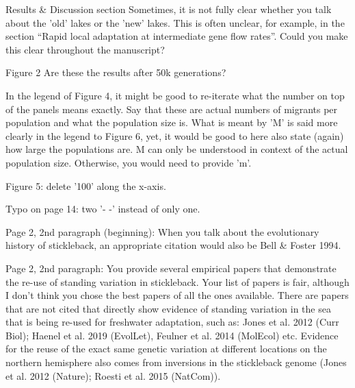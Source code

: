\reply{
}

\begin{point}{Results \& Discussion section}
    Sometimes, it is not fully clear whether you talk about the 'old' lakes or the 'new' lakes. This is often unclear, for example, in the section ``Rapid local adaptation at intermediate gene flow rates''. Could you make this clear throughout the manuscript?
\end{point}

\reply{
}

\begin{point}{Figure 2}
    Are these the results after 50k generations?
\end{point}

\reply{
}

\begin{point}{}
    In the legend of Figure 4, it might be good to re-iterate what the number on top of the panels means exactly. Say that these are actual numbers of migrants per population and what the population size is. What is meant by 'M' is said more clearly in the legend to Figure 6, yet, it would be good to here also state (again) how large the populations are. M can only be understood in context of the actual population size. Otherwise, you would need to provide 'm'.
\end{point}

\reply{
}

\begin{point}{}
Figure 5: delete '100' along the x-axis.
\end{point}

\reply{
}

\begin{point}{}
Typo on page 14: two '- -' instead of only one.
\end{point}


\begin{point}{}
Page 2, 2nd paragraph (beginning): When you talk about the evolutionary history of stickleback, an appropriate citation would also be Bell \& Foster 1994.
\end{point}

\reply{
}

\begin{point}{}
Page 2, 2nd paragraph: You provide several empirical papers that demonstrate the re-use of standing variation in stickleback. Your list of papers is fair, although I don't think you chose the best papers of all the ones available. There are papers that are not cited that directly show evidence of standing variation in the sea that is being re-used for freshwater adaptation, such as: Jones et al. 2012 (Curr Biol); Haenel et al. 2019 (EvolLet), Feulner et al. 2014 (MolEcol) etc. Evidence for the reuse of the exact same genetic variation at different locations on the northern hemisphere also comes from inversions in the stickleback genome (Jones et al. 2012 (Nature); Roesti et al. 2015 (NatCom)).
\end{point}

